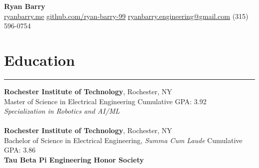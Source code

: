 \documentclass[letterpaper,10pt]{article}
\newcommand{\heading}[1]{%
    \vspace{-5mm} %
    \section*{#1}%
    \vspace{-3mm}%
    \noindent\hrule height 0.5pt %
    \vspace{4mm}%
}
\begin{document}
\begin{center}
    \vspace{-5mm} 
    \textbf{\huge Ryan Barry} \\
    \vspace{1mm}
    \href{http://ryanbarry.me}{ryanbarry.me}
    \hspace{0.2em} \vline \hspace{0.2em}
    \vspace{1mm}
    \href{http://github.com/ryan-barry-99}{github.com/ryan-barry-99}
    \hspace{0.2em} \vline \hspace{0.2em}
    \href{mailto:ryanbarry.engineering@gmail.com}{ryanbarry.engineering@gmail.com}
    \hspace{0.2em} \vline \hspace{0.2em}
    (315) 596-0754
\end{center}

\vspace{-3mm} %

\vspace{-0.5em}
\heading{Education}
\vspace{-1mm}%
\noindent\textbf{Rochester Institute of Technology}, Rochester, NY \\
Master of Science in Electrical Engineering \hfill Cumulative GPA: 3.92 \\
\textit{Specialization in Robotics and AI/ML} \\ \\
\noindent\textbf{Rochester Institute of Technology}, Rochester, NY \\
Bachelor of Science in Electrical Engineering, \textit{Summa Cum Laude} \hfill Cumulative GPA: 3.86 \\ 
\textbf{Tau Beta Pi Engineering Honor Society} \\



\end{document}
